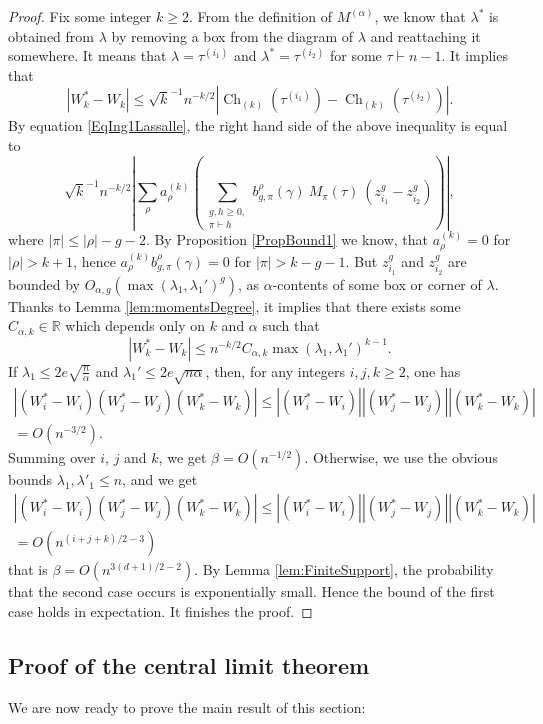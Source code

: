 \documentclass[11pt]{amsart}
\theoremstyle{plain}
\theoremstyle{remark}
\newcommand{\RR}{\mathbb{R}}
\DeclareMathOperator{\Ch}{Ch}
\begin{document}
\begin{proof}
Fix some integer $k \ge 2$. 
From the definition of $M^{(\alpha)}$, 
we know that $\lambda^*$ is obtained from $\lambda$ by removing a box from the diagram of $\lambda$ and reattaching it somewhere. It means that $\lambda = \tau^{(i_1)}$ and $\lambda^* = \tau^{(i_2)}$ for some $\tau \vdash n-1$. It implies that
\[ \left|W_k^* - W_k\right| \leq \sqrt{k}^{-1} n^{-k/2} \left| \Ch_{(k)}(\tau^{(i_1)}) - \Ch_{(k)}(\tau^{(i_2)}) \right| . \]
By equation \eqref{EqIng1Lassalle}, the right hand side of the above inequality is equal to
\[  \sqrt{k}^{-1} n^{-k/2}\left|\sum_\rho a^{(k)}_\rho \left( \sum_{\substack{g,h \geq 0, \\ \pi \vdash h}}
    b_{g,\pi}^\rho(\gamma)\ M_\pi(\tau)\ \left(z_{i_1}^g - z_{i_2}^g\right) \right)\right|,\]
    where $|\pi| \leq |\rho| - g - 2$.
By Proposition \ref{PropBound1} we know, that $a^{(k)}_\rho = 0$ for $|\rho| > k+1$, hence $a^{(k)}_\rho b_{g,\pi}^\rho(\gamma) = 0$ for $|\pi| > k-g-1$.
But $z_{i_1}^g$ and $z_{i_2}^g$ are bounded by $O_{\alpha,g}(\max(\lambda_1, \lambda_1')^g)$,
as $\alpha$-contents of some box or corner of $\lambda$.
Thanks to Lemma \ref{lem:momentsDegree}, it implies
that there exists some $C_{\alpha,k} \in \RR$ which depends only on $k$ and $\alpha$ such that
\[ \left|W_k^* - W_k\right| \leq n^{-k/2} C_{\alpha,k} \max(\lambda_1, \lambda_1')^{k-1}.\]
If $\lambda_1 \leq 2 e\sqrt{\frac{n}{\alpha}}$ and $\lambda_1' \leq 2 e\sqrt{n\alpha}$, then, for any integers $i,j,k \ge 2$, one has
\begin{multline}\label{eq:BoundTripleProductGoodCase}
\left|(W_i^* - W_i)(W_j^* - W_j)(W_k^* - W_k)\right| \leq  |(W_i^* - W_i)| |(W_j^* - W_j)| |(W_k^* - W_k)|\\
 = O(n^{-3/2}) .
\end{multline}
Summing over $i$, $j$ and $k$, we get $\beta = O(n^{-1/2})$.
Otherwise, we use the obvious bounds $\lambda_1,\lambda'_1 \le n$, and we get
\begin{multline}
\left|(W_i^* - W_i)(W_j^* - W_j)(W_k^* - W_k)\right| \leq  |(W_i^* - W_i)| |(W_j^* - W_j)| |(W_k^* - W_k)|\\
 = O(n^{(i+j+k)/2-3})
\end{multline}
that is $\beta = O(n^{3(d+1)/2-2})$.
By Lemma \ref{lem:FiniteSupport}, the probability that the second case occurs
is exponentially small.
Hence the bound of the first case holds in expectation. It finishes the proof.
\end{proof}

\subsection{Proof of the central limit theorem}
We are now ready to prove the main result of this section:
\end{document}
